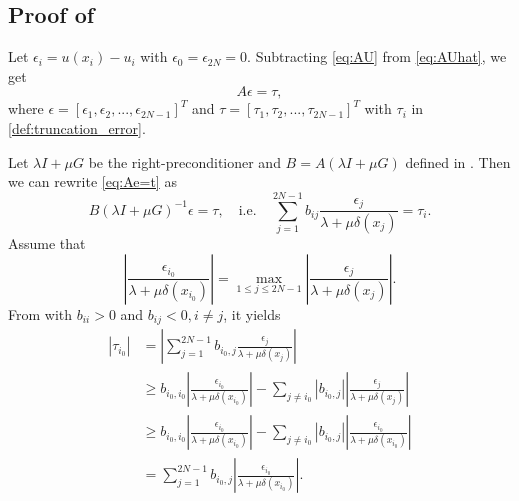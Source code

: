 \documentclass{amsart}
\theoremstyle{definition}
\theoremstyle{remark}
\numberwithin{equation}{section}
\begin{document}
\subsection{Proof of }
\label{subsec:proof-convergence}
Let \(\epsilon_i = u(x_i) - u_i\) with $\epsilon_0 = \epsilon_{2N} = 0$.
Subtracting \eqref{eq:AU} from \eqref{eq:AUhat}, we get %
\begin{equation} \label{eq:Ae=t}
    A \epsilon = \tau,
\end{equation}
where $\epsilon = [\epsilon_1, \epsilon_2, ... , \epsilon_{2N-1}]^T$ and $\tau=[\tau_1, \tau_2, ... , \tau_{2N-1}]^T$ with $\tau_i$ in \eqref{def:truncation_error}.

Let $\lambda I + \mu G$ be the right-preconditioner and $B=A(\lambda I + \mu G)$ defined in .
Then we can rewrite \eqref{eq:Ae=t} as %
\begin{equation*}
    B (\lambda I+ \mu G)^{-1} \epsilon = \tau,
    \quad \text{i.e.} \quad
  \sum_{j=1}^{2N-1} b_{ij} \frac{\epsilon_j}{\lambda + \mu \delta(x_j)} = \tau_i .
\end{equation*}
Assume that 
\begin{equation*}
  \left|\frac{\epsilon_{i_0}}{\lambda + \mu \delta(x_{i_0})} \right| 
  = \max_{1\le j\le 2N-1} \left|\frac{\epsilon_j}{\lambda + \mu \delta(x_j)} \right|. 
\end{equation*}
From  with $b_{ii} > 0$ and $b_{ij} < 0, i\neq j$, it yields
\begin{equation*}
  \begin{aligned}
    |\tau_{i_0}| &= \left|\sum_{j=1}^{2N-1} b_{i_0, j} \frac{\epsilon_j}{\lambda +  \mu\delta(x_j)}\right|  \\
    &\ge b_{i_0, i_0} \left| \frac{\epsilon_{i_0}}{\lambda +  \mu\delta(x_{i_0})} \right| - \sum_{j\ne i_0} |b_{i_0, j}| \left| \frac{\epsilon_j}{\lambda +  \mu\delta(x_j)} \right| \\
    &\ge b_{i_0, i_0} \left| \frac{\epsilon_{i_0}}{\lambda +  \mu\delta(x_{i_0})} \right| - \sum_{j\ne i_0} |b_{i_0, j}| \left|\frac{\epsilon_{i_0}}{\lambda +  \mu\delta(x_{i_0})} \right| \\
    &= \sum_{j=1}^{2N-1} b_{i_0, j} \left|\frac{\epsilon_{i_0}}{\lambda +  \mu\delta(x_{i_0})}\right|  .
  \end{aligned}
\end{equation*}
\end{document}
